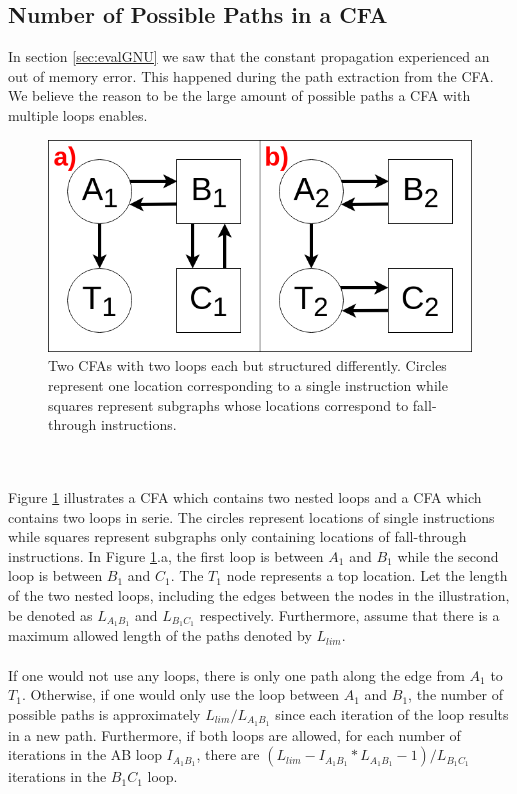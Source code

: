 \documentclass{kththesis}
\begin{document}
\subsection{Number of Possible Paths in a CFA}\label{sec:numPaths}
In section \ref{sec:evalGNU} we saw that the constant propagation experienced an out of memory error. This happened during the path extraction from the CFA. We believe the reason to be the large amount of possible paths a CFA with multiple loops enables.
\begin{figure}[th]
    \centering
    \includegraphics[scale=0.3]{Images/nestedCFA.png}
    \caption[Two CFAs with two loops each but structured differently.]{Two CFAs with two loops each but structured differently. Circles represent one location corresponding to a single instruction while squares represent subgraphs whose locations correspond to fall-through instructions.}
    \label{fig:pathExpNested}
\end{figure}
\\ \\
Figure \ref{fig:pathExpNested} illustrates a CFA which contains two nested loops and a CFA which contains two loops in serie. The circles represent locations of single instructions while squares represent subgraphs only containing locations of fall-through instructions. In Figure \ref{fig:pathExpNested}.a, the first loop is between $A_1$ and $B_1$ while the second loop is between $B_1$ and $C_1$. The $T_1$ node represents a top location. Let the length of the two nested loops, including the edges between the nodes in the illustration, be denoted as $L_{A_1B_1}$ and $L_{B_1C_1}$ respectively. Furthermore, assume that there is a maximum allowed length of the paths denoted by $L_{lim}$.
\\ \\ 
If one would not use any loops, there is only one path along the edge from $A_1$ to $T_1$. Otherwise, if one would only use the loop between $A_1$ and $B_1$, the number of possible paths is approximately $L_{lim}/L_{A_1B_1}$ since each iteration of the loop results in a new path. Furthermore, if both loops are allowed, for each number of iterations in the AB loop $I_{A_1B_1}$, there are $(L_{lim}-I_{A_1B_1}*L_{A_1B_1}-1)/L_{B_1C_1}$ iterations in the $B_1C_1$ loop.
\end{document}
